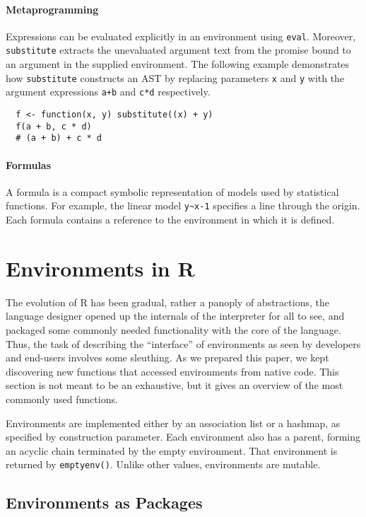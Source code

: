 \documentclass[10pt,review,sigplan,authorversion=true]{acmart}
\renewcommand{\c}[1]{\lstinline |#1|\xspace}
\newcommand{\eval}{\c{eval}}
\newcommand{\substitute}{\c{substitute}}
\begin{document}
\paragraph{Metaprogramming}

Expressions can be evaluated explicitly in an
environment using \eval. Moreover, \substitute extracts the unevaluated argument
text from the promise bound to an argument in the supplied environment. The
following example demonstrates how \substitute constructs an AST by replacing
parameters \c{x} and \c{y} with the argument expressions \c{a+b} and \c{c*d}
respectively.


\begin{lstlisting}
  f <- function(x, y) substitute((x) + y)
  f(a + b, c * d)
  # (a + b) + c * d
\end{lstlisting}


\paragraph{Formulas}  A formula is a compact symbolic representation of models
used by statistical functions. For example, the linear model \c{y~x-1}
specifies a line through the origin. Each formula contains a reference to the
environment in which it is defined.

\newpage
\section{Environments in R}

The evolution of R has been gradual, rather a panoply of abstractions, the
language designer opened up the internals of the interpreter for all to see, and
packaged some commonly needed functionality with the core of the language. Thus,
the task of describing the ``interface'' of environments as seen by developers
and end-users involves some sleuthing. As we prepared this paper, we kept
discovering new functions that accessed environments from native code. This
section is not meant to be an exhaustive, but it gives an overview of the most
commonly used functions.

Environments are implemented either by an association list or a hashmap, as
specified by construction parameter. Each environment also has a parent, forming
an acyclic chain terminated by the empty environment. That environment is
returned by \c{emptyenv()}. Unlike other values, environments are mutable.

\subsection{Environments as Packages}
\end{document}
